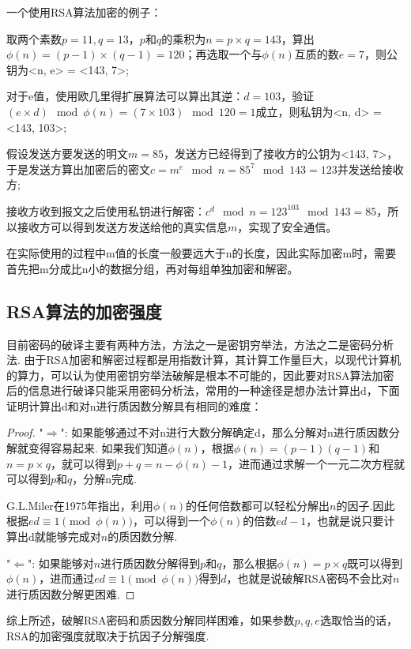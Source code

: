 \documentclass[UTF8]{ctexart}
\begin{document}
一个使用RSA算法加密的例子：

取两个素数$p = 11, q = 13$，$p$和$q$的乘积为$n = p \times q = 143$，算出$\phi(n) = (p-1) \times (q-1) = 120$；再选取一个与$\phi(n)$互质的数$e = 7$，则公钥为<n, e> = <143, 7>;

对于e值，使用欧几里得扩展算法可以算出其逆：$d = 103$，验证$(e \times d) \mod \phi(n) = (7 \times 103) \mod 120 = 1$成立，则私钥为<n, d> = <143, 103>;

假设发送方要发送的明文$m = 85$，发送方已经得到了接收方的公钥为<143, 7>，于是发送方算出加密后的密文$c = m^e \mod n = 85^7 \mod 143 = 123$并发送给接收方;

接收方收到报文之后使用私钥进行解密：$c^d \mod n = 123^{103} \mod 143 = 85$，所以接收方可以得到发送方发送给他的真实信息$m$，实现了安全通信。

在实际使用的过程中m值的长度一般要远大于n的长度，因此实际加密m时，需要首先把m分成比n小的数据分组，再对每组单独加密和解密。

\subsection{RSA算法的加密强度}

目前密码的破译主要有两种方法，方法之一是密钥穷举法，方法之二是密码分析法. 由于RSA加密和解密过程都是用指数计算，其计算工作量巨大，以现代计算机的算力，可以认为使用密钥穷举法破解是根本不可能的，因此要对RSA算法加密后的信息进行破译只能采用密码分析法，常用的一种途径是想办法计算出d，下面证明计算出d和对n进行质因数分解具有相同的难度：

\begin{proof}
    "$\Rightarrow$":
    如果能够通过不对n进行大数分解确定d，那么分解对n进行质因数分解就变得容易起来.
    如果我们知道$\phi(n)$，根据$\phi(n) = (p-1)(q-1)$和$n = p \times q$，就可以得到$p + q = n - \phi(n) - 1$，进而通过求解一个一元二次方程就可以得到$p$和$q$，分解n完成.

    G.L.Miler在1975年指出，利用$\phi(n)$的任何倍数都可以轻松分解出$n$的因子.因此根据$ed \equiv 1 \pmod{\phi(n)}$，可以得到一个$\phi(n)$的倍数$ed - 1$，也就是说只要计算出d就能够完成对$n$的质因数分解.

    "$\Leftarrow$":
    如果能够对$n$进行质因数分解得到$p$和$q$，那么根据$\phi(n) = p \times q$既可以得到$\phi(n)$，进而通过$ed \equiv 1 \pmod{\phi(n)}$得到$d$，也就是说破解RSA密码不会比对$n$进行质因数分解更困难.
\end{proof}

综上所述，破解RSA密码和质因数分解同样困难，如果参数$p, q, e$选取恰当的话，RSA的加密强度就取决于抗因子分解强度.
\end{document}

